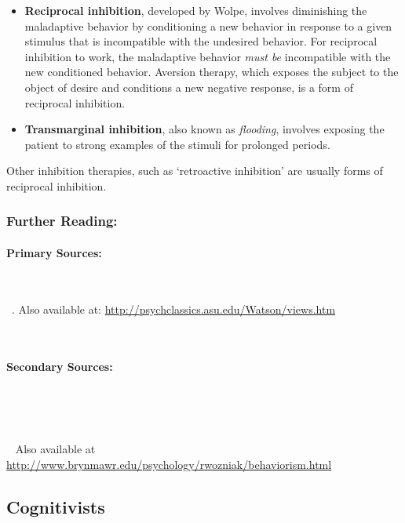 \begin{refsection}
\begin{itemize}
\item \textbf{Reciprocal inhibition}, developed by Wolpe, involves diminishing the maladaptive behavior by conditioning a new behavior in response to a given stimulus that is incompatible with the undesired behavior. For reciprocal inhibition to work, the maladaptive behavior \emph{must be} incompatible with the new conditioned behavior. Aversion therapy, which exposes the subject to the object of desire and conditions a new negative response, is a form of reciprocal inhibition.

\item \textbf{Transmarginal inhibition}, also known as \emph{flooding}, involves exposing the patient to strong examples of the stimuli for prolonged periods.

\end{itemize}

Other inhibition therapies, such as `retroactive inhibition' are usually forms of reciprocal inhibition.

\subsubsection{Further Reading:}
\label{furtherreading:}

\paragraph{Primary Sources:}
\label{primarysources:}

~\citep{Skinner:2005wr}

~\citep{Watson:1913tq}. Also available at: \url{http://psychclassics.asu.edu/Watson/views.htm}

~\citep{Watson:iMwU-3B8}

\paragraph{Secondary Sources:}
\label{secondarysources:}

~\citep{Hornstein:2002wq}

~\citep{Wolpe:1958vt}

~\citep{Wozniak:1997vj} Also available at \url{http://www.brynmawr.edu/psychology/rwozniak/behaviorism.html}

\subsection{Cognitivists}
\label{cognitivists}


\end{refsection}
